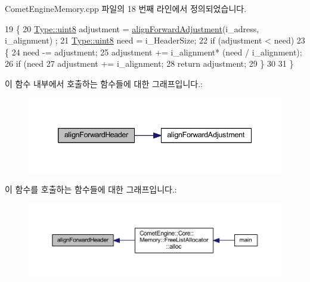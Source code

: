 Comet\+Engine\+Memory.\+cpp 파일의 18 번째 라인에서 정의되었습니다.


\begin{DoxyCode}
19 \{
20     \hyperlink{namespace_comet_engine_1_1_type_a1b09856a6463f2bcc4bd8ff0e4e3ee0f}{Type::uint8} adjustment = \hyperlink{namespace_comet_engine_1_1_core_1_1_memory_1_1_utils_aa5a0140d498d631a747be87791063f2d}{alignForwardAdjustment}(i\_adress, i\_alignment)
      ;
21     \hyperlink{namespace_comet_engine_1_1_type_a1b09856a6463f2bcc4bd8ff0e4e3ee0f}{Type::uint8} need = i\_HeaderSize;
22     \textcolor{keywordflow}{if} (adjustment < need)
23     \{
24         need -= adjustment;
25         adjustment += i\_alignment* (need / i\_alignment);
26         \textcolor{keywordflow}{if} (need %
27             adjustment += i\_alignment;
28         \textcolor{keywordflow}{return} adjustment;
29     \}
30 
31 \}
\end{DoxyCode}
이 함수 내부에서 호출하는 함수들에 대한 그래프입니다.\+:\nopagebreak
\begin{figure}[H]
\begin{center}
\leavevmode
\includegraphics[width=339pt]{namespace_comet_engine_1_1_core_1_1_memory_1_1_utils_a57bbceefc56fa0e2ec1e472d85ce5e19_cgraph}
\end{center}
\end{figure}
이 함수를 호출하는 함수들에 대한 그래프입니다.\+:
\nopagebreak
\begin{figure}[H]
\begin{center}
\leavevmode
\includegraphics[width=350pt]{namespace_comet_engine_1_1_core_1_1_memory_1_1_utils_a57bbceefc56fa0e2ec1e472d85ce5e19_icgraph}
\end{center}
\end{figure}
\mbox{\label{namespace_comet_engine_1_1_core_1_1_memory_1_1_utils_a4e360b8988f0de099daa987e3b5f09ed}} 
